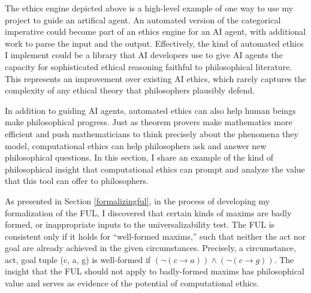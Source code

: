 \begin{isabellebody}
\begin{isamarkuptext}
The ethics engine depicted above is a high-level example of one way to use my project to guide an artifical agent.
An automated version of the categorical imperative could become part of an ethics engine 
for an AI agent, with additional work to parse the input and the output. Effectively, the kind 
of automated ethics I implement could be a library that AI developers use to give AI agents the capacity for 
sophisticated ethical reasoning faithful to philosophical literature. This represents an improvement 
over existing AI ethics, which rarely captures the complexity 
of any ethical theory that philosophers plausibly defend.%
\end{isamarkuptext}\isamarkuptrue%
%
\isadelimdocument
%
\endisadelimdocument
%
\isatagdocument
%
\isamarkuptrue%
%
\endisatagdocument
{\isafolddocument}%
%
\isadelimdocument
%
\endisadelimdocument
%
\begin{isamarkuptext}%
In addition to guiding AI agents, automated ethics can also help human beings make philosophical
progress. Just as theorem provers make mathematics more efficient and push mathematicians to think 
precisely about the phenomena they model, computational ethics can help philosophers ask and answer
new philosophical questions. In this section, I share an example of the kind of philosophical insight that computational ethics 
can prompt and analyze the value that this tool can offer to philosophers.%
\end{isamarkuptext}\isamarkuptrue%
%
\isadelimdocument
%
\endisadelimdocument
%
\isatagdocument
%
\isamarkuptrue%
%
\endisatagdocument
{\isafolddocument}%
%
\isadelimdocument
%
\endisadelimdocument
%
\begin{isamarkuptext}%
As presented in Section \ref{formalizingful}, in the process of developing my formalization of
the FUL, I discovered that certain kinds of maxims are badly formed, or inappropriate inputs to the 
universalizability test. The FUL is consistent only if it holds for ``well-formed maxims,''
such that neither the act nor goal are already achieved in the given circumstances. Precisely, 
a circumstance, act, goal tuple (c, a, g) is well-formed if $(\neg (c \longrightarrow a) ) \wedge 
(\neg(c \longrightarrow g))$. The insight that the FUL should not apply to badly-formed maxims has 
philosophical value and serves as evidence of the potential of computational ethics. 


\end{isamarkuptext}
\end{isabellebody}
